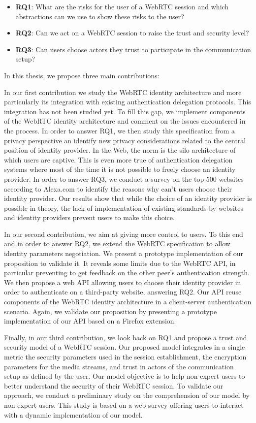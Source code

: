 \begin{itemize}
\item \textbf{RQ1}: What are the risks for the user of a WebRTC session and which abstractions can we use to show these risks to the user?
\item \textbf{RQ2}: Can we act on a WebRTC session to raise the trust and security level? 
\item \textbf{RQ3}: Can users choose actors they trust to participate in the communication setup?
\end{itemize}

In this thesis, we propose three main contributions:

In our first contribution we study the WebRTC identity architecture and more particularly its integration with existing authentication delegation protocols.
This integration has not been studied yet. 
To fill this gap, we implement components of the WebRTC identity architecture and comment on the issues encountered in the process.
In order to answer RQ1, we then study this specification from a privacy perspective an identify new privacy considerations related to the central position of identity provider.
In the Web, the norm is the silo architecture of which users are captive.
This is even more true of authentication delegation systems where most of the time it is not possible to freely choose an identity provider.
In order to answer RQ3, we conduct a survey on the top 500 websites according to Alexa.com to identify the reasons why can't users choose their identity provider.
Our results show that while the choice of an identity provider is possible in theory, the lack of implementation of existing standards by websites and identity providers prevent users to make this choice.

In our second contribution, we aim at giving more control to users.
To this end and in order to answer RQ2, we extend the WebRTC specification to allow identity parameters negotiation.
We present a prototype implementation of our proposition to validate it.
It reveals some limits due to the WebRTC API, in particular preventing to get feedback on the other peer's authentication strength.
We then propose a web API allowing users to choose their identity provider in order to authenticate on a third-party website, answering RQ2.
Our API reuse components of the WebRTC identity architecture in a client-server authentication scenario. 
Again, we validate our proposition by presenting a prototype implementation of our API based on a Firefox extension.

Finally, in our third contribution, we look back on RQ1 and propose a trust and security model of a WebRTC session.
Our proposed model integrates in a single metric the security parameters used in the session establishment, the encryption parameters for the media streams, and trust in actors of the communication setup as defined by the user.
Our model objective is to help non-expert users to better understand the security of their WebRTC session.
To validate our approach, we conduct a preliminary study on the comprehension of our model by non-expert users.
This study is based on a web survey offering users to interact with a dynamic implementation of our model.